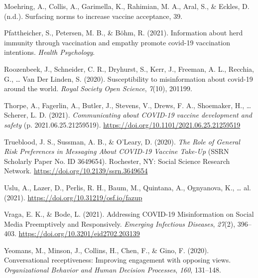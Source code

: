 \documentclass[english,,jou,floatsintext]{apa6}
\begin{document}
\leavevmode\hypertarget{ref-moehring_surfacing_2021}{}%
Moehring, A., Collis, A., Garimella, K., Rahimian, M. A., Aral, S., \& Eckles, D. (n.d.). Surfacing norms to increase vaccine acceptance, 39.

\leavevmode\hypertarget{ref-pfattheicher2021information}{}%
Pfattheicher, S., Petersen, M. B., \& Böhm, R. (2021). Information about herd immunity through vaccination and empathy promote covid-19 vaccination intentions. \emph{Health Psychology}.

\leavevmode\hypertarget{ref-roozenbeek2020susceptibility}{}%
Roozenbeek, J., Schneider, C. R., Dryhurst, S., Kerr, J., Freeman, A. L., Recchia, G., \ldots{} Van Der Linden, S. (2020). Susceptibility to misinformation about covid-19 around the world. \emph{Royal Society Open Science}, \emph{7}(10), 201199.

\leavevmode\hypertarget{ref-thorpe_communicating_2021}{}%
Thorpe, A., Fagerlin, A., Butler, J., Stevens, V., Drews, F. A., Shoemaker, H., \ldots{} Scherer, L. D. (2021). \emph{Communicating about COVID-19 vaccine development and safety} (p. 2021.06.25.21259519). \url{https://doi.org/10.1101/2021.06.25.21259519}

\leavevmode\hypertarget{ref-trueblood_role_2020}{}%
Trueblood, J. S., Sussman, A. B., \& O'Leary, D. (2020). \emph{The Role of General Risk Preferences in Messaging About COVID-19 Vaccine Take-Up} (SSRN Scholarly Paper No. ID 3649654). Rochester, NY: Social Science Research Network. \url{https://doi.org/10.2139/ssrn.3649654}

\leavevmode\hypertarget{ref-uslu2021}{}%
Uslu, A., Lazer, D., Perlis, R. H., Baum, M., Quintana, A., Ognyanova, K., \ldots{} al. (2021). \url{https://doi.org/10.31219/osf.io/fazup}

\leavevmode\hypertarget{ref-vraga_addressing_2021}{}%
Vraga, E. K., \& Bode, L. (2021). Addressing COVID-19 Misinformation on Social Media Preemptively and Responsively. \emph{Emerging Infectious Diseases}, \emph{27}(2), 396--403. \url{https://doi.org/10.3201/eid2702.203139}

\leavevmode\hypertarget{ref-yeomans2020conversational}{}%
Yeomans, M., Minson, J., Collins, H., Chen, F., \& Gino, F. (2020). Conversational receptiveness: Improving engagement with opposing views. \emph{Organizational Behavior and Human Decision Processes}, \emph{160}, 131--148.
\end{document}
